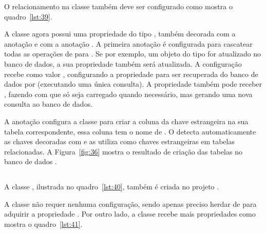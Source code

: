 O relacionamento na classe  também deve ser configurado como mostra o quadro~\ref{lst:39}.


A classe  agora possui uma propriedade do tipo , também decorada com a anotação  e com a anotação . A primeira anotação é configurada para cascatear todas as operações de  para . Se por exemplo, um objeto do tipo  for atualizado no banco de dados, a sua propriedade  também será atualizada. A configuração  recebe como valor , configurando a propriedade  para ser recuperada do banco de dados por  (executando uma única consulta). A propriedade  também pode receber , fazendo com que  só seja carregado quando necessário, mas gerando uma nova consulta ao banco de dados.

A anotação  configura a classe  para criar a coluna da chave estrangeira na sua tabela correspondente, essa coluna tem o nome de . O  detecta automaticamente as chaves decoradas com  e as utiliza como chaves estrangeiras em tabelas relacionadas. A Figura~\ref{fig:36} mostra o resultado de criação das tabelas no banco de dados . 


\subsection{}

A classe , ilustrada no quadro~\ref{lst:40}, também é criada no projeto .


A classe  não requer nenhuma configuração, sendo apenas preciso herdar de  para adquirir a propriedade . Por outro lado, a classe  recebe mais propriedades como mostra o quadro~\ref{lst:41}.


